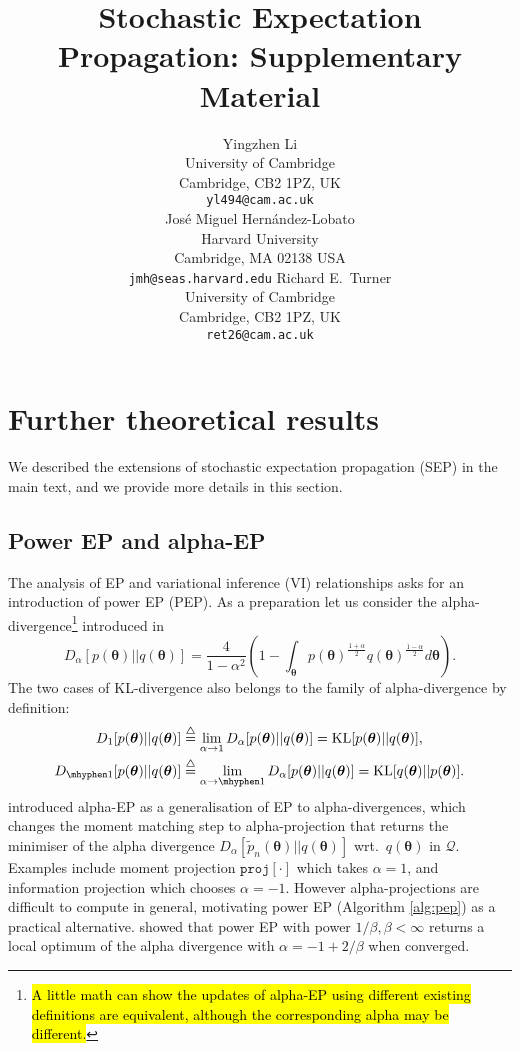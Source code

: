 \documentclass{article} %
\title{Stochastic Expectation Propagation: Supplementary Material}
\author{
Yingzhen Li \\
University of Cambridge\\
Cambridge, CB2 1PZ, UK \\
\texttt{yl494@cam.ac.uk} \\
\And
Jos\'e Miguel Hern\'andez-Lobato\\
Harvard University \\
Cambridge, MA 02138 USA \\
\texttt{jmh@seas.harvard.edu}
\And
Richard E.~Turner \\
University of Cambridge\\
Cambridge, CB2 1PZ, UK \\
\texttt{ret26@cam.ac.uk} \\
}
\begin{document}
\maketitle

\appendix

\section{Further theoretical results}
We described the extensions of stochastic expectation propagation (SEP) in the main text, and we provide more details in this section.

\subsection{Power EP and alpha-EP}
The analysis of EP and variational inference (VI) relationships asks for an introduction of power EP (PEP). As a preparation let us consider the alpha-divergence\footnote{\hl{A little math can show the updates of alpha-EP using different existing definitions are equivalent, although the corresponding alpha may be different.}} introduced in \cite{amari:ig1985}
\begin{equation}
D_{\alpha}[p(\bm{\theta}) || q(\bm{\theta})] = \frac{4}{1 - \alpha^2} 
		\left( 1 - \int_{\bm{\theta}} p(\bm{\theta})^{ \frac{1+\alpha}{2}} q(\bm{\theta})^{ \frac{1- \alpha}{2}} d\bm{\theta} \right).
\end{equation} 
The two cases of KL-divergence also belongs to the family of alpha-divergence by definition:
\begin{align}
D_{1}[p(\bm{\theta})||q(\bm{\theta})] &\buildrel\triangle\over = \lim_{\alpha \rightarrow 1} D_{\alpha}[p(\bm{\theta})||q(\bm{\theta})]  = \mathrm{KL}[p(\bm{\theta}) || q(\bm{\theta})], \\
D_{ \mhyphen 1}[p(\bm{\theta})||q(\bm{\theta})] &\buildrel\triangle\over = \lim_{\alpha \rightarrow \mhyphen 1} D_{\alpha}[p(\bm{\theta}) || q(\bm{\theta})]  = \mathrm{KL}[q(\bm{\theta}) || p(\bm{\theta})].
\end{align}
\cite{minka:powerep} introduced alpha-EP as a generalisation of EP to alpha-divergences, which changes the moment matching step to alpha-projection \cite{amari:alpha_proj} that returns the minimiser of the alpha divergence $D_{\alpha}[\tilde{p}_n(\bm{\theta}) || q(\bm{\theta})]$ wrt.~$q(\bm{\theta})$ in $\mathcal{Q}$. Examples include moment projection $\mathtt{proj}[\cdot]$ which takes $\alpha = 1$, and information projection which chooses $\alpha = -1$. However alpha-projections are difficult to compute in general, motivating power EP (Algorithm \ref{alg:pep}) as a practical alternative. \cite{minka:powerep} showed that power EP with power $1 / \beta, \beta < \infty$ returns a local optimum of the alpha divergence with $\alpha = -1 + 2 / \beta$ when converged. 
\end{document}
